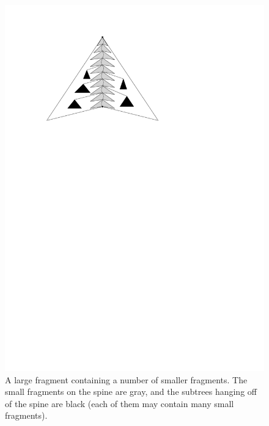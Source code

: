 \documentclass[a4paper,UKenglish]{lipics-v2016}
\theoremstyle{plain}
\begin{document}
\begin{figure}[h]
\begin{center}
\includegraphics[scale=1]{refinement}
\end{center}
\caption{A large fragment containing a number of smaller fragments. The small fragments on the spine are gray, and the subtrees hanging off of the spine are black (each of them may contain many small fragments). %
\label{figure of small fragments inside a large fragment}}
\end{figure}
\end{document}
